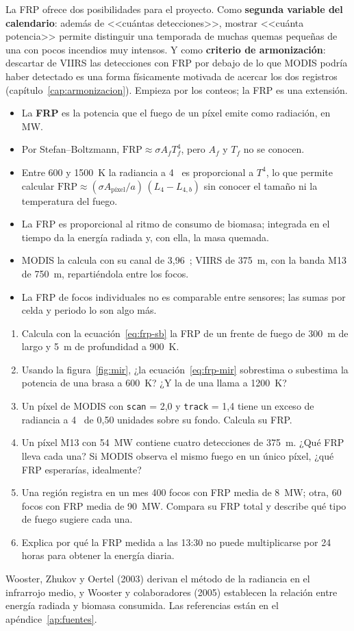 \begin{parareto}
La FRP ofrece dos posibilidades para el proyecto. Como \textbf{segunda variable del calendario}:
además de <<cuántas detecciones>>, mostrar <<cuánta potencia>> permite distinguir una temporada
de muchas quemas pequeñas de una con pocos incendios muy intensos. Y como \textbf{criterio de
armonización}: descartar de VIIRS las detecciones con FRP por debajo de lo que MODIS podría
haber detectado es una forma físicamente motivada de acercar los dos registros
(capítulo~\ref{cap:armonizacion}). Empieza por los conteos; la FRP es una extensión.
\end{parareto}

\resumen

\begin{itemize}
  \item La \textbf{FRP} es la potencia que el fuego de un píxel emite como radiación, en MW.
  \item Por Stefan--Boltzmann, $\mathrm{FRP} \approx \sigma A_f T_f^4$, pero $A_f$ y $T_f$ no se
  conocen.
  \item Entre 600 y 1500~K la radiancia a 4~\um{} es proporcional a $T^4$, lo que permite
  calcular $\mathrm{FRP} \approx (\sigma A_{\text{píxel}}/a)\,(L_4 - L_{4,b})$ sin conocer el
  tamaño ni la temperatura del fuego.
  \item La FRP es proporcional al ritmo de consumo de biomasa; integrada en el tiempo da la
  energía radiada y, con ella, la masa quemada.
  \item MODIS la calcula con su canal de 3,96~\um; VIIRS de 375~m, con la banda M13 de 750~m,
  repartiéndola entre los focos.
  \item La FRP de focos individuales no es comparable entre sensores; las sumas por celda y
  periodo lo son algo más.
\end{itemize}

\ejercicios

\begin{enumerate}
  \item Calcula con la ecuación~\eqref{eq:frp-sb} la FRP de un frente de fuego de 300~m de largo
  y 5~m de profundidad a 900~K.
  \item Usando la figura~\ref{fig:mir}, ¿la ecuación~\eqref{eq:frp-mir} sobrestima o subestima
  la potencia de una brasa a 600~K? ¿Y la de una llama a 1200~K?
  \item Un píxel de MODIS con \texttt{scan} = 2,0 y \texttt{track} = 1,4 tiene un exceso de
  radiancia a 4~\um{} de 0,50 unidades sobre su fondo. Calcula su FRP.
  \item Un píxel M13 con 54~MW contiene cuatro detecciones de 375~m. ¿Qué FRP lleva cada una?
  Si MODIS observa el mismo fuego en un único píxel, ¿qué FRP esperarías, idealmente?
  \item Una región registra en un mes 400 focos con FRP media de 8~MW; otra, 60 focos con FRP
  media de 90~MW. Compara su FRP total y describe qué tipo de fuego sugiere cada una.
  \item Explica por qué la FRP medida a las 13:30 no puede multiplicarse por 24 horas para
  obtener la energía diaria.
\end{enumerate}

\lecturas

Wooster, Zhukov y Oertel (2003) derivan el método de la radiancia en el infrarrojo medio, y
Wooster y colaboradores (2005) establecen la relación entre energía radiada y biomasa
consumida. Las referencias están en el apéndice~\ref{ap:fuentes}.
